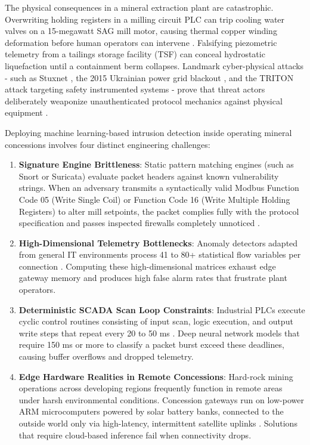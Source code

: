 \documentclass[conference]{IEEEtran}
\begin{document}
The physical consequences in a mineral extraction plant are catastrophic. Overwriting holding registers in a milling circuit PLC can trip cooling water valves on a 15-megawatt SAG mill motor, causing thermal copper winding deformation before human operators can intervene \cite{butko2022cyber, amin2013cyber}. Falsifying piezometric telemetry from a tailings storage facility (TSF) can conceal hydrostatic liquefaction until a containment berm collapses. Landmark cyber-physical attacks - such as Stuxnet \cite{langner2011stuxnet, falliere2011w32}, the 2015 Ukrainian power grid blackout \cite{lee2014industrial}, and the TRITON attack targeting safety instrumented systems \cite{dipinto2018triton} - prove that threat actors deliberately weaponize unauthenticated protocol mechanics against physical equipment \cite{lin2018cyber, zhou2020deep}.

Deploying machine learning-based intrusion detection inside operating mineral concessions involves four distinct engineering challenges:
\begin{enumerate}
    \item \textbf{Signature Engine Brittleness}: Static pattern matching engines (such as Snort or Suricata) evaluate packet headers against known vulnerability strings. When an adversary transmits a syntactically valid Modbus Function Code 05 (Write Single Coil) or Function Code 16 (Write Multiple Holding Registers) to alter mill setpoints, the packet complies fully with the protocol specification and passes inspected firewalls completely unnoticed \cite{alanazi2022scada, hsu2017modbus}.
    \item \textbf{High-Dimensional Telemetry Bottlenecks}: Anomaly detectors adapted from general IT environments process 41 to 80+ statistical flow variables per connection \cite{kheddar2023deep, moustafa2015unsw, sharafaldin2018toward}. Computing these high-dimensional matrices exhaust edge gateway memory and produces high false alarm rates that frustrate plant operators.
    \item \textbf{Deterministic SCADA Scan Loop Constraints}: Industrial PLCs execute cyclic control routines consisting of input scan, logic execution, and output write steps that repeat every 20 to 50 ms \cite{amin2013cyber, stouffer2023guide}. Deep neural network models that require 150 ms or more to classify a packet burst exceed these deadlines, causing buffer overflows and dropped telemetry.
    \item \textbf{Edge Hardware Realities in Remote Concessions}: Hard-rock mining operations across developing regions frequently function in remote areas under harsh environmental conditions. Concession gateways run on low-power ARM microcomputers powered by solar battery banks, connected to the outside world only via high-latency, intermittent satellite uplinks \cite{butko2022cyber, litvinenko2020digital}. Solutions that require cloud-based inference fail when connectivity drops.
\end{enumerate}
\end{document}
